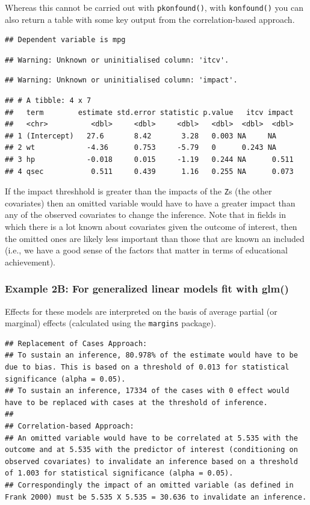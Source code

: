 \documentclass[man]{apa6}
\theoremstyle{definition}
\theoremstyle{definition}
\theoremstyle{definition}
\theoremstyle{remark}
\begin{document}
Whereas this cannot be carried out with \texttt{pkonfound()}, with
\texttt{konfound()} you can also return a table with some key output
from the correlation-based approach.

\begin{verbatim}
## Dependent variable is mpg
\end{verbatim}

\begin{verbatim}
## Warning: Unknown or uninitialised column: 'itcv'.
\end{verbatim}

\begin{verbatim}
## Warning: Unknown or uninitialised column: 'impact'.
\end{verbatim}

\begin{verbatim}
## # A tibble: 4 x 7
##   term        estimate std.error statistic p.value   itcv impact
##   <chr>          <dbl>     <dbl>     <dbl>   <dbl>  <dbl>  <dbl>
## 1 (Intercept)   27.6       8.42       3.28   0.003 NA     NA    
## 2 wt            -4.36      0.753     -5.79   0      0.243 NA    
## 3 hp            -0.018     0.015     -1.19   0.244 NA      0.511
## 4 qsec           0.511     0.439      1.16   0.255 NA      0.073
\end{verbatim}

If the impact threshhold is greater than the impacts of the \texttt{Z}s
(the other covariates) then an omitted variable would have to have a
greater impact than any of the observed covariates to change the
inference. Note that in fields in which there is a lot known about
covariates given the outcome of interest, then the omitted ones are
likely less important than those that are known an included (i.e., we
have a good sense of the factors that matter in terms of educational
achievement).

\subsubsection{Example 2B: For generalized linear models fit with
glm()}\label{example-2b-for-generalized-linear-models-fit-with-glm}

Effects for these models are interpreted on the basis of average partial
(or marginal) effects (calculated using the \texttt{margins} package).

\begin{verbatim}
## Replacement of Cases Approach:
## To sustain an inference, 80.978% of the estimate would have to be due to bias. This is based on a threshold of 0.013 for statistical significance (alpha = 0.05).
## To sustain an inference, 17334 of the cases with 0 effect would have to be replaced with cases at the threshold of inference.
## 
## Correlation-based Approach:
## An omitted variable would have to be correlated at 5.535 with the outcome and at 5.535 with the predictor of interest (conditioning on observed covariates) to invalidate an inference based on a threshold of 1.003 for statistical significance (alpha = 0.05).
## Correspondingly the impact of an omitted variable (as defined in Frank 2000) must be 5.535 X 5.535 = 30.636 to invalidate an inference.
\end{verbatim}
\end{document}
